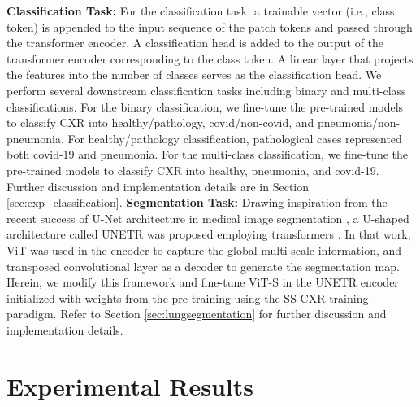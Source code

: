 \documentclass[10pt,journal,compsoc]{IEEEtran}
\begin{document}
\noindent \textbf{Classification Task:}
For the classification task, a trainable vector (i.e., class token) is appended to the input sequence of the patch tokens and passed through the transformer encoder. A classification head is added to the output of the transformer encoder corresponding to the class token.  A linear layer that projects the features into the number of classes serves as the classification head.  
We perform several downstream classification tasks including binary and multi-class classifications. For the binary classification, we fine-tune the pre-trained models to classify CXR into healthy/pathology, covid/non-covid, and pneumonia/non-pneumonia. For healthy/pathology classification, pathological cases represented both covid-19 and pneumonia. For the multi-class classification, we fine-tune the pre-trained models to classify CXR into healthy, pneumonia, and covid-19. Further discussion and implementation details are in Section \ref{sec:exp_classification}.
\noindent \textbf{Segmentation Task:}
Drawing inspiration from the recent success of U-Net architecture in medical image segmentation \cite{unet}, a U-shaped architecture called UNETR was proposed employing transformers \cite{unetr}. In that work, ViT was used in the encoder to capture the global multi-scale information, and transposed convolutional layer as a decoder to generate the segmentation map. Herein, we modify this framework and fine-tune ViT-S in the UNETR encoder initialized with weights from the pre-training using the SS-CXR training paradigm. Refer to Section \ref{sec:lungsegmentation} for further discussion and implementation details.


\section{Experimental Results}
\end{document}
